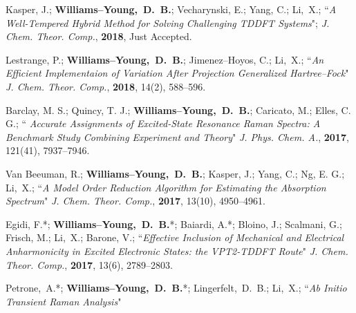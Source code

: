 \documentclass[10pt]{res} %
\newcommand*\me[0]{{\bf Williams--Young,~D.~B.}}
\newcommand*\xsli[0]{Li,~X.}
\begin{document}
\begin{resume}
\vspace{10pt} %
\begin{etaremune}
  \item Kasper, J.; \me; Vecharynski, E.; Yang, C.; \xsli;
        ``\emph{A Well-Tempered Hybrid Method for Solving Challenging 
	  TDDFT Systems}";
        \emph{J. Chem. Theor. Comp.}, \textbf{2018}, Just Accepted.
  \item Lestrange, P.; \me; Jimenez--Hoyos, C.; \xsli;
        ``\emph{An Efficient Implementaion of Variation After Projection 
	  Generalized Hartree--Fock}"
        \emph{J. Chem. Theor. Comp.}, \textbf{2018}, 14(2), 588--596.
  \item Barclay, M. S.; Quincy, T. J.; \me; Caricato, M.; Elles, C. G.;
        ``\emph{ Accurate Assignments of Excited-State Resonance Raman 
                 Spectra: A Benchmark Study Combining Experiment and 
                 Theory}"
        \emph{J. Phys. Chem. A.}, \textbf{2017}, 121(41), 7937--7946.
  \item Van Beeuman, R.; \me; Kasper, J.; Yang, C.; Ng, E. G.; \xsli;
        ``\emph{A Model Order Reduction Algorithm for Estimating the 
	        Absorption Spectrum}"
        \emph{J. Chem. Theor. Comp.}, \textbf{2017}, 13(10), 4950--4961.
  \item Egidi, F.*; \me*; Baiardi, A.*; Bloino, J.; Scalmani, G.; Frisch, M.; 
        \xsli; Barone, V.; 
        ``\emph{Effective Inclusion of Mechanical and Electrical Anharmonicity in 
                Excited Electronic States: the VPT2-TDDFT Route}"
          \emph{J. Chem. Theor. Comp.}, \textbf{2017}, 13(6), 2789--2803.
  \item Petrone,~A.*; \me*; Lingerfelt,~D.~B.; \xsli;
        ``\emph{Ab Initio Transient Raman Analysis}"

\end{etaremune}
\end{resume}
\end{document}

